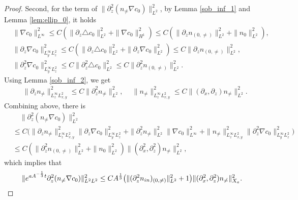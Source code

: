 \documentclass[12pt, reqno]{amsart}
\numberwithin{equation}{section}
\begin{document}
\begin{proof}
		Second, for the term of $\|\partial_z^2(n_{\neq}\nabla c_{0})\|^2_{L^2}$,  by Lemma \ref{sob_inf_1} and Lemma \ref{lem:ellip_0}, it holds 
		\begin{equation*}
			\begin{aligned}
				&\|\nabla c_{0}\|^2_{L^{\infty}}
				\leq C(\|\partial_z\triangle c_{0}\|^2_{L^{2}}+\|\nabla c_{0}\|^2_{H^{1}})
				\leq C(\|\partial_zn_{(0,\neq)}\|^2_{L^{2}}
				+\|n_{0}\|^2_{L^{2}}),\\
				&\|\partial_z\nabla c_{0}\|^2_{L^{\infty}_{y}L^2_z}
				\leq C(\|\partial_z\triangle c_{0}\|^2_{L^{2}}+
				\|\partial_z\nabla c_{0}\|^2_{L^{2}})
				\leq C\|\partial_zn_{(0,\neq)}\|^2_{L^{2}},\\
				&\|\partial_z^2\nabla c_{0}\|^2_{L^{\infty}_yL^2_z}
				\leq C\|\partial_z^2\triangle c_{0}\|^2_{L^{2}}
				\leq C\|\partial_z^2 n_{(0,\neq)}\|^2_{L^{2}}.
			\end{aligned}
		\end{equation*}
		Using Lemma \ref{sob_inf_2}, we get 
		\begin{equation*}
			\begin{aligned}
				&\|\partial_zn_{\neq}\|^2_{L^{\infty}_{z}L^2_{x,y}}\leq C\|\partial_z^2n_{\neq}\|^2_{L^2},~~
				&\|n_{\neq}\|^2_{L^{\infty}_{z}L^2_{x,y}}\leq C\|(\partial_x,\partial_z)n_{\neq}\|^2_{L^{2}}.
			\end{aligned}
		\end{equation*}
		Combining above, there is   
		\begin{equation*}
			\begin{aligned}
				&\quad\|\partial_z^2(n_{\neq}\nabla c_{0})\|^2_{L^2}\\
				&\leq C\big(\|\partial_zn_{\neq}\|^2_{L^{\infty}_{z}L^2_{x,y}}
				\|\partial_z\nabla c_{0}\|^2_{L^{\infty}_{y}L^2_{z}}
				+\|\partial_z^2n_{\neq}\|^2_{L^2}
				\|\nabla c_{0}\|^2_{L^{\infty}}
				+\|n_{\neq}\|^2_{L^{\infty}_{z}L^2_{x,y}}
				\|\partial_z^2\nabla c_{0}\|^2_{L^{\infty}_{y}L^2_{z}}
				\big)\\
				&\leq C(\|\partial_z^2n_{(0,\neq)}\|^2_{L^2}+
				\|n_{0}\|^2_{L^2})
				\|(\partial_x^2,\partial_z^2)n_{\neq}\|^2_{L^{2}},
			\end{aligned}
		\end{equation*}
		which implies that 
		\begin{equation*}
			\begin{aligned}
				\|{\rm e}^{aA^{-\frac{1}{3}}t}
				\partial_z^2(n_{\neq}\nabla c_{0})\|^2_{L^2L^2}\leq 
				CA^{\frac13}\big(\|(\partial_z^2n_{\rm in})_{(0,\neq)}\|_{L^2}^2
				+1\big)
				\|(\partial_x^2,\partial_z^2)n_{\neq}\|^2_{X_a}.
			\end{aligned}
		\end{equation*}
		

\end{proof}
\end{document}
